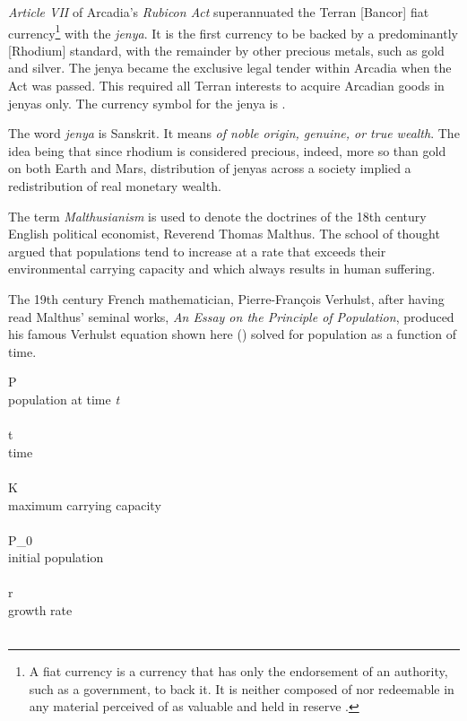 {\it Article VII} of Arcadia's {\it Rubicon Act} superannuated the Terran [Bancor] fiat currency\footnote{A fiat currency is a currency that has only the endorsement of an authority, such as a government, to back it. It is neither composed of nor redeemable in any material perceived of as valuable and held in reserve .} with the {\it jenya}. It is the first currency to be backed by a predominantly [Rhodium] standard, with the remainder by other precious metals, such as gold and silver. The jenya became the exclusive legal tender within Arcadia when the Act was passed. This required all Terran interests to acquire Arcadian goods in jenyas only. The currency symbol for the jenya is .

    {}

The word {\it jenya} is Sanskrit. It means {\it of noble origin, genuine, or true wealth}. The idea being that since rhodium is considered precious, indeed, more so than gold on both Earth and Mars, distribution of jenyas across a society implied a redistribution of real monetary wealth.

The term {\it Malthusianism} is used to denote the doctrines of the 18th century English political economist, Reverend Thomas Malthus. The school of thought argued that populations tend to increase at a rate that exceeds their environmental carrying capacity and which always results in human suffering. 

The 19th century French mathematician, Pierre-François Verhulst, after having read Malthus' seminal works, {\it An Essay on the Principle of Population}, produced his famous Verhulst equation shown here () solved for population as a function of time.
\crlf

\startformula
{}
\stopformula
\startlegend
\leg P \\ population at time {\it t} \\ \\
\leg t \\ time \\ \\
\leg K \\ maximum carrying capacity \\ \\
\leg P_0 \\ initial population \\ \\
\leg r \\ growth rate \\ \\
\stoplegend
\crlf

